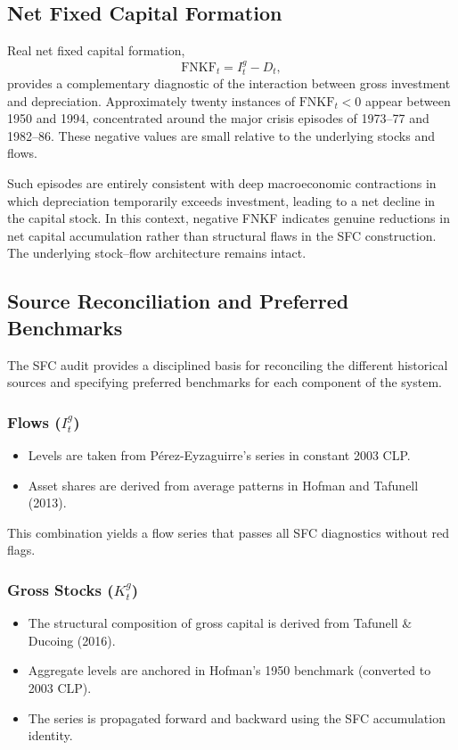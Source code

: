 \subsection{Net Fixed Capital Formation}

Real net fixed capital formation,
\[
\text{FNKF}_t = I^g_t - D_t,
\]
provides a complementary diagnostic of the interaction between gross investment and depreciation. Approximately twenty instances of \(\text{FNKF}_t < 0\) appear between 1950 and 1994, concentrated around the major crisis episodes of 1973--77 and 1982--86. These negative values are small relative to the underlying stocks and flows.

Such episodes are entirely consistent with deep macroeconomic contractions in which depreciation temporarily exceeds investment, leading to a net decline in the capital stock. In this context, negative FNKF indicates genuine reductions in net capital accumulation rather than structural flaws in the SFC construction. The underlying stock--flow architecture remains intact.

\subsection{Source Reconciliation and Preferred Benchmarks}

The SFC audit provides a disciplined basis for reconciling the different historical sources and specifying preferred benchmarks for each component of the system.

\subsubsection*{Flows (\(I^g_t\))}

\begin{itemize}
    \item Levels are taken from Pérez-Eyzaguirre’s series in constant 2003 CLP.
    \item Asset shares are derived from average patterns in Hofman and Tafunell (2013).
\end{itemize}

This combination yields a flow series that passes all SFC diagnostics without red flags.

\subsubsection*{Gross Stocks (\(K^g_t\))}

\begin{itemize}
    \item The structural composition of gross capital is derived from Tafunell \& Ducoing (2016).
    \item Aggregate levels are anchored in Hofman’s 1950 benchmark (converted to 2003 CLP).
    \item The series is propagated forward and backward using the SFC accumulation identity.
\end{itemize}


